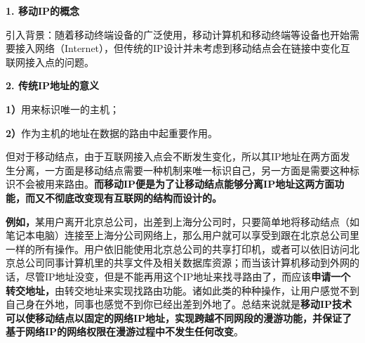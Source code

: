 {\textbf{1. 移动IP的概念}}

引入背景：随着移动终端设备的广泛使用，移动计算机和移动终端等设备也开始需要接入网络（Internet），但传统的IP设计并未考虑到移动结点会在链接中变化互联网接入点的问题。

\textbf{{2. 传统IP地址的意义}}

{\textbf{{1）}}}{用}来标识唯一的主机；

\textbf{2）}作为主机的地址在数据的路由中起重要作用。

但对于移动结点，由于互联网接入点会不断发生变化，所以其IP地址在两方面发生分离，一方面是移动结点需要一种机制来唯一标识自己，另一方面是需要这种标识不会被用来路由。\textbf{{而移动IP便是为了让移动结点能够分离IP地址这两方面功能，而又不彻底改变现有互联网的结构而设计的。}}

\textbf{{例如，}}{某用户离开北京总公司，出差到上海分公司时，只要简单地将移动结点（如笔记本电脑）连接至上海分公司网络上，那么用户就可以享受到跟在北京总公司里一样的所有操作。用户依旧能使用北京总公司的共享打印机，或者可以依旧访问北京总公司同事计算机里的共享文件及相关数据库资源；而当该计算机移动到外网的话，尽管IP地址没变，但是不能再用这个IP地址来找寻路由了，而应该}\textbf{{{申请一个转交地址}，}}{由转交地址来实现找路由功能。诸如此类的种种操作，让用户感觉不到自己身在外地，同事也感觉不到你已经出差到外地了。总结来说就是\textbf{移动IP技术可以使移动结点以固定的网络IP地址，实现跨越不同网段的漫游功能，并保证了基于网络IP的网络权限在漫游过程中不发生任何改变}。}
